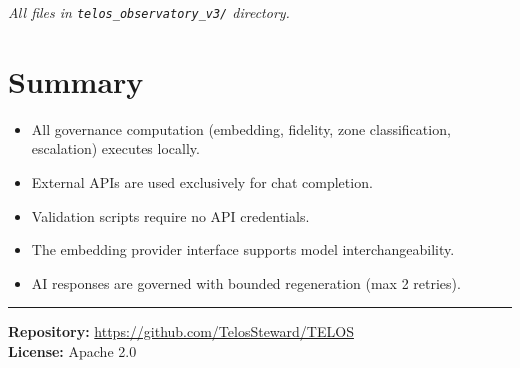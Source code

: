 \documentclass[11pt,twocolumn]{article}
\begin{document}
\noindent\textit{All files in \texttt{telos\_observatory\_v3/} directory.}

\section{Summary}

\begin{itemize}
    \item All governance computation (embedding, fidelity, zone classification, escalation) executes locally.
    \item External APIs are used exclusively for chat completion.
    \item Validation scripts require no API credentials.
    \item The embedding provider interface supports model interchangeability.
    \item AI responses are governed with bounded regeneration (max 2 retries).
\end{itemize}

\vspace{1em}
\hrule
\vspace{0.5em}
\textbf{Repository:} \url{https://github.com/TelosSteward/TELOS}\\
\textbf{License:} Apache 2.0
\end{document}

